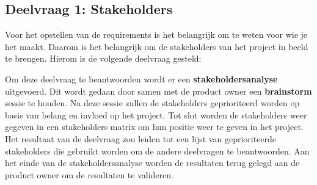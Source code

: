 \subsection{Deelvraag 1: Stakeholders}
Voor het opstellen van de requirements is het belangrijk om te weten voor wie je het maakt.
Daarom is het belangrijk om de stakeholders van het project in beeld te brengen.
Hierom is de volgende deelvraag gesteld:

\begin{center}
	\textit{\SubquestionOne}
\end{center}

\whitespace[0.2]
Om deze deelvraag te beantwoorden wordt er een \textbf{stakeholdersanalyse} uitgevoerd.
Dit wordt gedaan door samen met de product owner een \textbf{brainstorm} sessie te houden.
Na deze sessie zullen de stakeholders geprioriteerd worden op basis van belang en invloed op het project.
Tot slot worden de stakeholders weer gegeven in een stakeholders matrix om hun positie weer te geven in het project.
Het resultaat van de deelvraag zou leiden tot een lijst van geprioriteerde stakeholders die gebruikt worden om de andere deelvragen te beantwoorden.
Aan het einde van de stakeholdersanalyse worden de resultaten terug gelegd aan de product owner om de resultaten te valideren.
